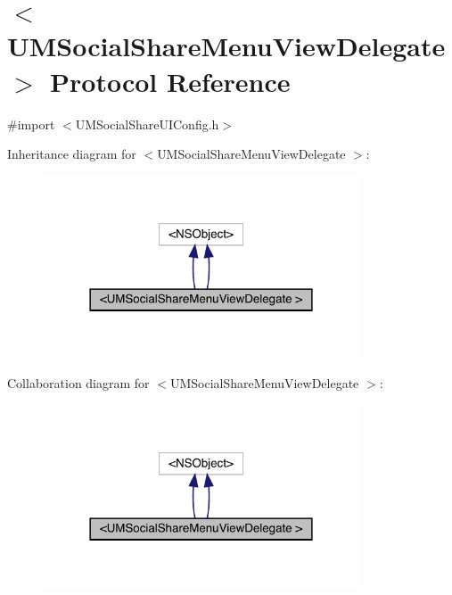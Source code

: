 \hypertarget{protocol_u_m_social_share_menu_view_delegate_01-p}{}\section{$<$U\+M\+Social\+Share\+Menu\+View\+Delegate $>$ Protocol Reference}
\label{protocol_u_m_social_share_menu_view_delegate_01-p}


{\ttfamily \#import $<$U\+M\+Social\+Share\+U\+I\+Config.\+h$>$}



Inheritance diagram for $<$U\+M\+Social\+Share\+Menu\+View\+Delegate $>$\+:\nopagebreak
\begin{figure}[H]
\begin{center}
\leavevmode
\includegraphics[width=266pt]{protocol_u_m_social_share_menu_view_delegate_01-p__inherit__graph}
\end{center}
\end{figure}


Collaboration diagram for $<$U\+M\+Social\+Share\+Menu\+View\+Delegate $>$\+:\nopagebreak
\begin{figure}[H]
\begin{center}
\leavevmode
\includegraphics[width=266pt]{protocol_u_m_social_share_menu_view_delegate_01-p__coll__graph}
\end{center}
\end{figure}
